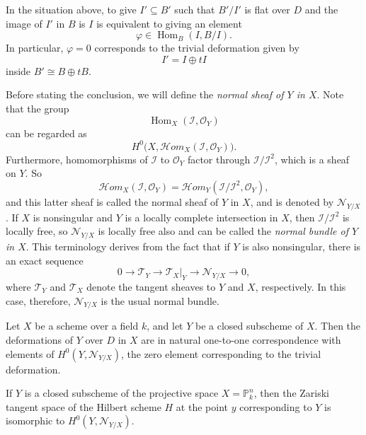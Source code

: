 \begin{proposition}
\label{proposition-affine-first-order}
In the situation above, to give
$I'\subseteq B'$ such that $B'/I'$ is flat
over $D$ and the image of $I'$ in $B$ is $I$
is equivalent to giving an element
$$
\varphi\in\operatorname{Hom}_B(I,B/I).
$$
In particular, $\varphi=0$ corresponds to the
trivial deformation given by
$$
I'=I\oplus tI
$$
inside $B'\cong B\oplus tB$.
\end{proposition}

\begin{definition}
\label{definition-normal-sheaf}
Before stating the conclusion, we will
define the \emph{normal sheaf of $Y$ in
$X$}. Note that the group
$$
\operatorname{Hom}_X
(\mathcal{I},\mathcal{O}_Y)
$$
can be regarded as
$$
H^0\bigl(X,
\mathcal{H}om_X
(\mathcal{I},\mathcal{O}_Y)\bigr).
$$
Furthermore, homomorphisms of $\mathcal{I}$
to $\mathcal{O}_Y$ factor through
$\mathcal{I}/\mathcal{I}^2$, which is a sheaf
on $Y$. So
$$
\mathcal{H}om_X
(\mathcal{I},\mathcal{O}_Y)
=
\mathcal{H}om_Y
(\mathcal{I}/\mathcal{I}^2,
\mathcal{O}_Y),
$$
and this latter sheaf is called the normal
sheaf of $Y$ in $X$, and is denoted by
$\mathcal{N}_{Y/X}$. If $X$ is nonsingular
and $Y$ is a locally complete intersection
in $X$, then $\mathcal{I}/\mathcal{I}^2$ is
locally free, so $\mathcal{N}_{Y/X}$ is
locally free also and can be called the
\emph{normal bundle of $Y$ in $X$}. This
terminology derives from the fact that if
$Y$ is also nonsingular, there is an exact
sequence
$$
0\longrightarrow\mathcal{T}_Y
\longrightarrow\mathcal{T}_X|_Y
\longrightarrow\mathcal{N}_{Y/X}
\longrightarrow 0,
$$
where $\mathcal{T}_Y$ and $\mathcal{T}_X$
denote the tangent sheaves to $Y$ and $X$,
respectively. In this case, therefore,
$\mathcal{N}_{Y/X}$ is the usual normal
bundle.
\end{definition}

\begin{theorem}
\label{theorem-embedded-first-order}
Let $X$ be a scheme over a field $k$, and let
$Y$ be a closed subscheme of $X$. Then the
deformations of $Y$ over $D$ in $X$ are in
natural one-to-one correspondence with
elements of $H^0(Y,\mathcal{N}_{Y/X})$, the
zero element corresponding to the trivial
deformation.
\end{theorem}

\begin{lemma}[Corollary]
\label{lemma-hilbert-tangent-first-order}
If $Y$ is a closed subscheme of the
projective space $X=\mathbb{P}^n_k$, then the
Zariski tangent space of the Hilbert scheme
$H$ at the point $y$ corresponding to $Y$ is
isomorphic to $H^0(Y,\mathcal{N}_{Y/X})$.
\end{lemma}

